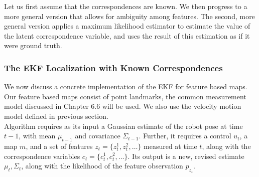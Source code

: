 Let us first assume that the correspondences are known. We then progress to a more general version that allows for ambiguity among features.
The second, more general version applies a maximum likelihood estimator to estimate the value of the latent correspondence variable, and uses the result of this estimation as if it were ground truth.

\subsubsection{The EKF Localization with Known Correspondences}
We now discuss a concrete implementation of the EKF for feature based maps.
Our feature based maps consist of point landmarks, the common measurement model discussed in Chapter 6.6 will be used.
We also use the velocity motion model defined in previous section.\\

Algorithm requires as its input a Gaussian estimate of the robot pose at time $t-1$, with mean $\mu_{t-1}$ and covariance $\Sigma_{t-1}$.
Further, it requires a control $u_t$, a map $m$, and a set of features $z_t = \{ z_t^1, z_t^2, \dots\}$ measured at time $t$, along with the correspondence variables $c_t = \{c_t^1, c_t^2, \dots\}$.
Its output is a new, revised estimate $\mu_t, \Sigma_t$, along with the likelihood of the feature observation $p_{z_t}$.\\

